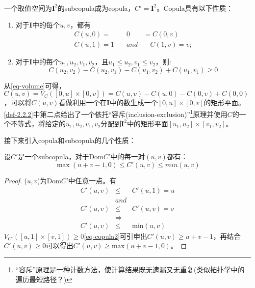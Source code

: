 \begin{definition}
    一个取值空间为$\mathbf{I}^2$的subcopula成为copula，$C' = \mathbf{I}^2$。Copula具有以下性质：
    \begin{enumerate}
        \item 对于$\mathbf{I}$中的每个$u,v$，都有
            \begin{eqnarray}
                C(u,0) = &0& = C(0,v) \\
                C(u,1) = 1 \quad &and& \quad C(1,v) = v;
                \label{eq-copula1}
            \end{eqnarray}
        \item 对于$\mathbf{I}$中的每个$u_1,u_2,v_1,v_2$，且$u_1 \leq u_2, v_1 \leq v_2$，则:
            \begin{equation}
                C(u_2,v_2) - C(u_2,v_1) - C(u_1,v_2)+C(u_1,v_1) \geq 0
                \label{eq-copula2}
            \end{equation}
    \end{enumerate}
    \label{def-2.2.2}
\end{definition}
从\cref{eq-volume}可得，$C(u,v)=V_C([0,u]\times[0,v]) = C(u,v)-C(u,0)-C(0,v)+C(0,0)$，可以将$C(u,v)$看做利用一个在$\mathbf{I}$中的数生成一个$[0,u]\times[0,v]$的矩形平面。\cref{def-2.2.2}中第二点给出了一个依托``容斥(\textcolor[rgb]{1,0,0}{inclusion-exclusion})''\footnote{``容斥''原理是一种计数方法，使计算结果既无遗漏又无重复(类似拓扑学中的遍历最短路径？)}原理并使用$C$的一个不等式，将给定的$u_1,u_2,v_1,v_2$分配到$\mathbf{I}^2$中的矩形平面$[u_1,u_2]\times[v_1,v_2]$。



接下来引入copula和subcopula的几个性质：
\begin{theorem}
    设$C'$是一个subcopula，对于Dom$C'$中的每一对$(u,v)$都有：
    \begin{equation}
        \max(u+v-1,0) \leq C'(u,v) \leq min(u,v)
        \label{eq-thr2.2.3}
    \end{equation}
    \label{thr2.2.3}
\end{theorem}

\begin{proof}
    ($u,v$)为Dom$C'$中任意一点。有
    \begin{eqnarray*}
        C'(u,v) &\leq& C'(u,1) = u \\
        &and& \\
        C'(u,v) &\leq& C'(u,v) = v \\
        &\Rightarrow& \\
        C'(u,v) &\leq& \text{min} (u,v)
    \end{eqnarray*}
    $V_{C'}([u,1]\times[v,1]) \geq 0$\cref{eq-copula2}可引申出$C'(u,v)\geq u+v-1$，再结合$C'(u,v) \geq 0$可以得出$C'(u,v)\geq \text{max}(u+v-1,0)$。
\end{proof}

